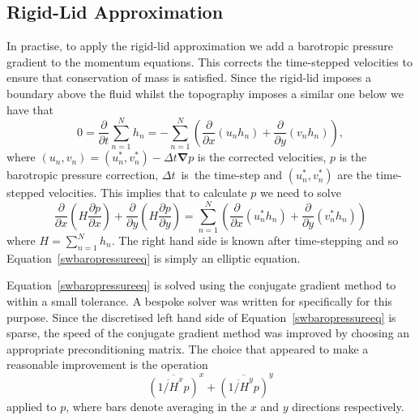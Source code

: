 \documentclass[12pt,a4paper]{report}
\newcommand*\equref[1]{Equation~\eqref{#1}}
\begin{document}
  \subsection{Rigid-Lid Approximation}
  
  In practise, to apply the rigid-lid approximation we add a barotropic pressure
  gradient to the momentum equations. This corrects the time-stepped velocities 
  to ensure that conservation of mass is satisfied. Since the rigid-lid imposes a
  boundary above the fluid whilst the topography imposes a similar one below 
  we have that 
  \begin{equation}
  0=\frac{  \partial}{\partial t} \sum^{N}_{n=1} h_{n} = -
  \sum^{N}_{n=1} \left( \frac{\partial }{\partial x} (u_{n}h_{n} )+ 
  \frac{\partial }{\partial y} (v_{n}h_{n} ) \right) ,
  \end{equation}
  where $\left(u_n,v_n\right)=\left(u_n^{*},v^{*}_n\right)-\Delta t \boldsymbol{\nabla}p$
  is the corrected velocities, $p$ is the barotropic pressure correction,
  $\Delta t$~is~the time-step and
  $\left(u_n^{*},v^{*}_n\right)$ are the time-stepped velocities. This implies that to
  calculate $p$ we need to solve 
  \begin{equation}
  \frac{  \partial}{\partial x} \left( H \frac{  \partial p}{\partial x} \right) +
  \frac{  \partial}{\partial y} \left( H \frac{  \partial p}{\partial y} \right) =
  \sum^{N}_{n=1} \left( \frac{\partial }{\partial x} (u^{*}_{n}h_{n} )+ 
  \frac{\partial }{\partial y} (v^{*}_{n}h_{n} ) \right)
  \label{swbaropressureeq}
  \end{equation}
  where $H= \sum^{N}_{n=1} h_{n}$. The right hand side is known after time-stepping 
  and so \equref{swbaropressureeq} is simply an elliptic equation. 
  
  \equref{swbaropressureeq} is solved using
  the conjugate gradient method to within a small tolerance. 
  A bespoke solver was written for specifically for this purpose. Since
  the discretised left hand side of \equref{swbaropressureeq} is sparse, the speed of the 
  conjugate gradient method was improved by choosing an appropriate preconditioning matrix.
  The choice that appeared to make a reasonable improvement is the operation
  \begin{equation}
  \overline{\left(\overline{1/H}^{x} p\right) }^{x} + \overline{\left(\overline{1/H}^{y} p\right) }^{y}
  \end{equation}
  applied to $p$, where bars denote averaging in the $x$ and $y$ directions respectively.
  
\end{document}
